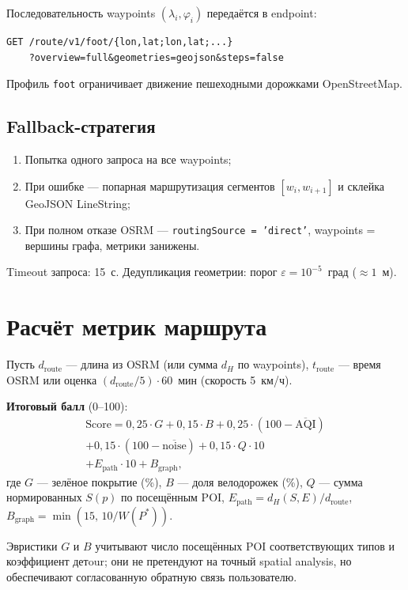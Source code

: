 Последовательность waypoints $(\lambda_i, \varphi_i)$ передаётся в endpoint:
\begin{verbatim}
GET /route/v1/foot/{lon,lat;lon,lat;...}
    ?overview=full&geometries=geojson&steps=false
\end{verbatim}

Профиль \texttt{foot} ограничивает движение пешеходными дорожками OpenStreetMap.

\subsection{Fallback-стратегия}

\begin{enumerate}
  \item Попытка одного запроса на все waypoints;
  \item При ошибке --- попарная маршрутизация сегментов $[w_i, w_{i+1}]$ и склейка
        GeoJSON LineString;
  \item При полном отказе OSRM --- \texttt{routingSource = 'direct'}, waypoints =
        вершины графа, метрики занижены.
\end{enumerate}

Timeout запроса: 15~с. Дедупликация геометрии: порог $\varepsilon = 10^{-5}$~град
($\approx 1$~м).

\section{Расчёт метрик маршрута}

Пусть $d_{\mathrm{route}}$ --- длина из OSRM (или сумма $d_H$ по waypoints),
$t_{\mathrm{route}}$ --- время OSRM или оценка $(d_{\mathrm{route}} / 5) \cdot 60$~мин
(скорость 5~км/ч).

\textbf{Итоговый балл} (0--100):
\begin{multline}
  \mathrm{Score} = 0{,}25 \cdot G + 0{,}15 \cdot B + 0{,}25 \cdot (100 - \overline{\mathrm{AQI}}) \\
  + 0{,}15 \cdot (100 - \overline{\mathrm{noise}}) + 0{,}15 \cdot Q \cdot 10 \\
  + E_{\mathrm{path}} \cdot 10 + B_{\mathrm{graph}},
  \label{eq:total-score}
\end{multline}
где $G$ --- зелёное покрытие (\%), $B$ --- доля велодорожек (\%), $Q$ --- сумма
нормированных $S(p)$ по посещённым POI, $E_{\mathrm{path}} = d_H(S,E) / d_{\mathrm{route}}$,
$B_{\mathrm{graph}} = \min(15,\, 10 / W(P^*))$.

Эвристики $G$ и $B$ учитывают число посещённых POI соответствующих типов и
коэффициент детour; они не претендуют на точный spatial analysis, но обеспечивают
согласованную обратную связь пользователю.

